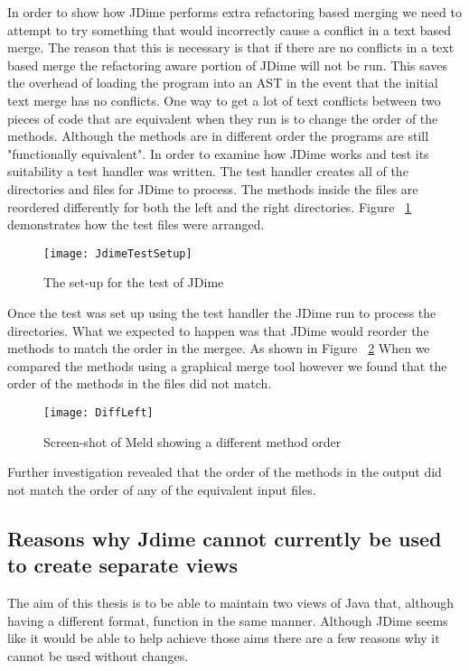 In order to show how JDime performs extra refactoring based merging we need to attempt to try something that would incorrectly cause a conflict in a text based merge.  The reason that this is necessary is that if there are no conflicts in a text based merge the refactoring aware portion of JDime will not be run.  This saves the overhead of loading the program into an AST in the event that the initial text merge has no conflicts. 
One way to get a lot of text conflicts between two pieces of code that are equivalent when they run is to change the order of the methods.
Although the methods are in different order the programs are still "functionally equivalent".
In order to examine how JDime works and test its suitability a test handler was written.
The test handler creates all of the directories and files for JDime to process.
The methods inside the files are reordered differently for both the left and the right directories.
Figure ~\ref{fig:bgJDimeTest} demonstrates how the test files were arranged.


\begin{figure}[!T]
\begin{center}
\texttt{[image: JdimeTestSetup]}
\end{center}
 \label{fig:bgJDimeTest}
 \caption{The set-up for the test of JDime}
\end{figure}

Once the test was set up using the test handler the JDime run to process the directories.
What we expected to happen was that JDime would reorder the methods to match the order in the mergee. As shown in Figure ~\ref{fig:bgJDimeScreenShot} When we compared the methods using a graphical merge tool however we found that the order of the methods in the files did not match.

\begin{figure}[h]
\begin{center}
\texttt{[image: DiffLeft]}
\end{center}
 \label{fig:bgJDimeScreenShot}
 \caption{Screen-shot of Meld showing a different method order}
\end{figure}


Further investigation revealed that the order of the methods in the output did not match the order of any of the equivalent input files.    

\subsection{Reasons why Jdime cannot currently be used to create separate views}
The aim of this thesis is to be able to maintain two views of Java that, although having a different format, function in the same manner.  Although JDime seems like it would be able to help achieve those aims there are a few reasons why it cannot be used without changes.

